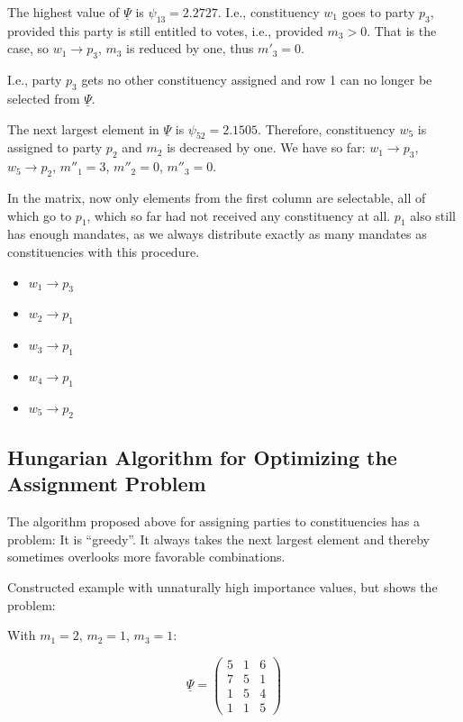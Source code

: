 The highest value of $\underline{\Psi}$ is $\psi_{13} = 2.2727$. I.e., constituency $w_1$
goes to party $p_3$, provided this party is still entitled to votes, i.e., provided $m_3 > 0$. That
is the case, so $w_1 \longrightarrow p_3$, $m_3$ is reduced by one, thus $m'_3 = 0$.

I.e., party $p_3$ gets no other constituency assigned and row 1 can no longer be selected from
$\underline{\Psi}$.

The next largest element in $\underline{\Psi}$ is $\psi_{52} = 2.1505$. Therefore, constituency
$w_5$ is assigned to party $p_2$ and $m_2$ is decreased by one. We have so far:
$w_1 \longrightarrow p_3$, $w_5 \longrightarrow p_2$, $m''_1 = 3$, $m''_2 = 0$, $m''_3 = 0$.

In the matrix, now only elements from the first column are selectable, all of which go to $p_1$,
which so far had not received any constituency at all. $p_1$ also still has enough
mandates, as we always distribute exactly as many mandates as constituencies with this procedure.


\begin{itemize}[label={}]
  \item $w_1 \longrightarrow p_3$
  \item $w_2 \longrightarrow p_1$
  \item $w_3 \longrightarrow p_1$
  \item $w_4 \longrightarrow p_1$
  \item $w_5 \longrightarrow p_2$
\end{itemize}

\subsection{Hungarian Algorithm for Optimizing the Assignment Problem}

The algorithm proposed above for assigning parties to constituencies has a problem: It
is \enquote{greedy}. It always takes the next largest element and thereby sometimes overlooks
more favorable combinations.

Constructed example with unnaturally high importance values, but shows the problem:

With $m_1 = 2$, $m_2 = 1$, $m_3 = 1$:

\[
  \underline{\Psi} = \begin{pmatrix}
    5 & 1 & 6 \\
    7 & 5 & 1 \\
    1 & 5 & 4 \\
    1 & 1 & 5
  \end{pmatrix}
\]

